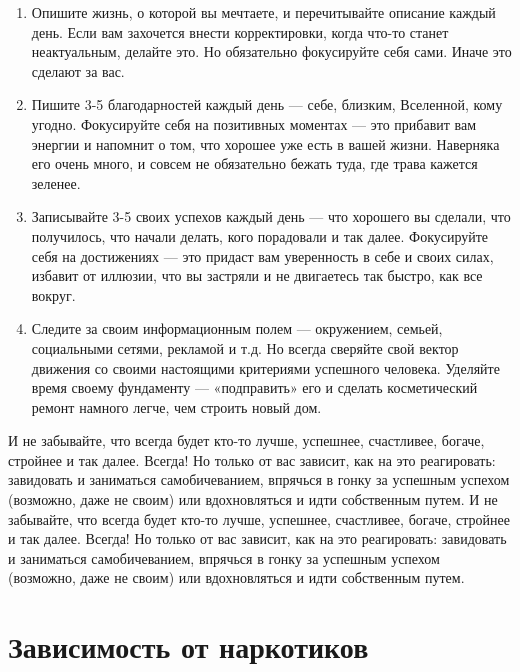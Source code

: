 \begin{enumerate}
    \item Опишите жизнь, о которой вы мечтаете, и перечитывайте описание каждый день. Если вам захочется внести корректировки, когда что-то станет неактуальным, делайте это. Но обязательно фокусируйте себя сами. Иначе это сделают за вас.
    \item Пишите 3-5 благодарностей каждый день — себе, близким, Вселенной, кому угодно. Фокусируйте себя на позитивных моментах — это прибавит вам энергии и напомнит о том, что хорошее уже есть в вашей жизни. Наверняка его очень много, и совсем не обязательно бежать туда, где трава кажется зеленее.
    \item Записывайте 3-5 своих успехов каждый день — что хорошего вы сделали, что получилось, что начали делать, кого порадовали и так далее. Фокусируйте себя на достижениях — это придаст вам уверенность в себе и своих силах, избавит от иллюзии, что вы застряли и не двигаетесь так быстро, как все вокруг.
    \item Следите за своим информационным полем — окружением, семьей, социальными сетями, рекламой и т.д. Но всегда сверяйте свой вектор движения со своими настоящими критериями успешного человека. Уделяйте время своему фундаменту — «подправить» его и сделать косметический ремонт намного легче, чем строить новый дом.
\end{enumerate}

И не забывайте, что всегда будет кто-то лучше, успешнее, счастливее, богаче, стройнее и так далее. Всегда! Но только от вас зависит, как на это реагировать: завидовать и заниматься самобичеванием, впрячься в гонку за успешным успехом (возможно, даже не своим) или вдохновляться и идти собственным путем. И не забывайте, что всегда будет кто-то лучше, успешнее, счастливее, богаче, стройнее и так далее. Всегда! Но только от вас зависит, как на это реагировать: завидовать и заниматься самобичеванием, впрячься в гонку за успешным успехом (возможно, даже не своим) или вдохновляться и идти собственным путем.

\clearpage


\section{Зависимость от наркотиков}

